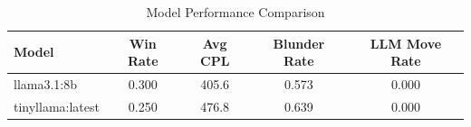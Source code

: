 \begin{table}[h]
\centering
\caption{Model Performance Comparison}
\begin{tabular}{lcccc}
\toprule
Model & Win Rate & Avg CPL & Blunder Rate & LLM Move Rate \\
\midrule
llama3.1:8b & 0.300 & 405.6 & 0.573 & 0.000 \\
tinyllama:latest & 0.250 & 476.8 & 0.639 & 0.000 \\
\bottomrule
\end{tabular}
\end{table}